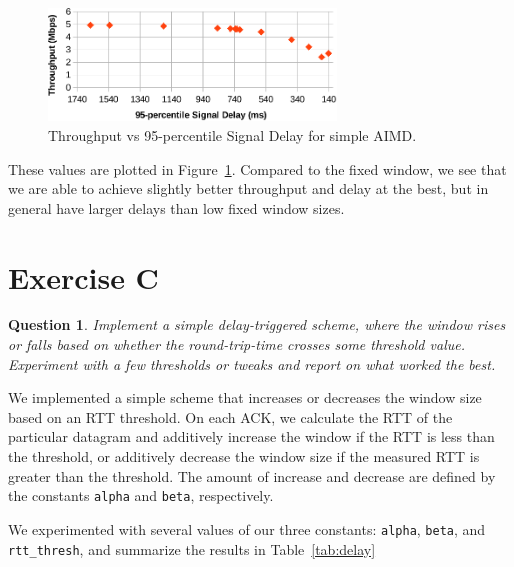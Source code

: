 \documentclass[twoside]{article}
\newtheorem{question}[theorem]{Question}
\begin{document}
\begin{figure}[h]
  \centering
  \includegraphics[height=3cm]{./img/exb_fig.pdf}
  \caption{Throughput vs 95-percentile Signal Delay for simple AIMD.}
  \label{fig:exb}
\end{figure}

These values are plotted in Figure~\ref{fig:exb}. Compared to the fixed window,
we see that we are able to achieve slightly better throughput and delay at
the best, but in general have larger delays than low fixed window sizes.


\vfill
\pagebreak

\section*{Exercise C}
\begin{question}
  Implement a simple delay-triggered scheme, where the window rises or falls
  based on whether the round-trip-time crosses some threshold value. Experiment
  with a few thresholds or tweaks and report on what worked the best.
\end{question}

We implemented a simple scheme that increases or decreases the window size
based on an RTT threshold. On each ACK, we calculate the RTT of the particular
datagram and additively increase the window if the RTT is less than the threshold,
or additively decrease the window size if the measured RTT is
greater than the threshold.
The amount of increase and decrease are defined by the constants
\texttt{alpha} and \texttt{beta}, respectively.

We experimented with several values of our three constants: \texttt{alpha},
\texttt{beta}, and \texttt{rtt\_thresh}, and summarize the results in
Table~\ref{tab:delay}
\end{document}
